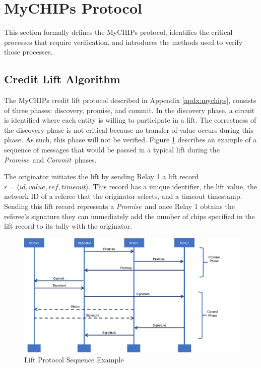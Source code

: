 \documentclass[runningheads]{llncs}
\newcommand{\promise}{\emph{Promise}}
\newcommand{\commit}{\emph{Commit}}
\newcommand{\figref}[1]{Figure \ref{#1}}
\newif\ifcomments
\newif\ifkylecomments
\newcommand{\egm}[1]{\ifcomments\textcolor{orange}{egm: #1}\fi}
\newcommand{\krs}[1]{\ifkylecomments\textcolor{blue}{krs: #1}\fi}
\begin{document}
\krs{ I think this is much better. \egm{Add some high-level discussion of very related work to frame how your solution is the same, or different, from what others have done to solve this issue. If other works just come up short, then state that, and then state how you are filling the gap. This discussion should be woven into the current narrative at the appropriate points. Finally, add two paragraphs to the end: one that summarizes the contributions of our work, and the other that gives the organization of the rest of the document.}}

\section{MyCHIPs Protocol}
\label{sec:protocol_def}
This section formally defines the MyCHIPs protocol, identifies the critical processes that require verification, and introduces the methods used to verify those processes.

\subsection{Credit Lift Algorithm}\label{sec:liftAlgorithm}
The MyCHIPs credit lift protocol described in Appendix \ref{apdx:mychips}, consists of three phases: discovery, promise, and commit. In the discovery phase, a circuit is identified where each entity is willing to participate in a lift. The correctness of the discovery phase is not critical because no transfer of value occurs during this phase. As such, this phase will not be verified.
\figref{fig:liftSequence} describes an example of a sequence of messages that would be passed in a typical lift during the \promise\ and \commit\ phases.

The originator initiates the lift by sending Relay 1 a lift record
\sloppy $r = \langle \mathit{id}, \mathit{value}, \mathit{ref}, \mathit{timeout}\rangle.$ This record has a unique identifier, the lift value, the network ID of a referee that the originator selects, and a timeout timestamp. Sending this lift record represents a \promise\ and once Relay 1 obtains the referee's signature they can immediately add the number of chips specified in the lift record to its tally with the originator.

\begin{figure}
    \centering
    \includegraphics[scale=0.35]{SequenceDiagramLifeline.png}
    \caption{Lift Protocol Sequence Example}
    \label{fig:liftSequence}
\end{figure}
\end{document}
